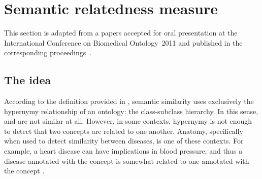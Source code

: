 \section{Semantic relatedness measure} \label{sec:enhancements/relatedness}

\begin{note-paper}
    This section is adapted from a papers accepted for oral presentation at the International Conference on Biomedical Ontology~2011 and published in the corresponding proceedings~\citep{Ferreira2011}.
\end{note-paper}

\subsection{The idea}

According to the definition provided in , semantic similarity uses exclusively the hypernymy relationship of an ontology: the class-subclass hierarchy. In this sense,  and  are not similar at all. However, in some contexts, hypernymy is not enough to detect that two concepts are related to one another. Anatomy, specifically when used to detect similarity between diseases, is one of these contexts. For example, a heart disease can have implications in blood pressure, and thus a disease annotated with the concept  is somewhat related to one annotated with the concept .

